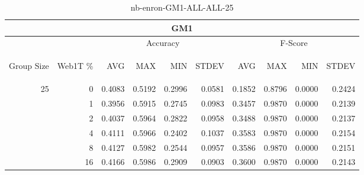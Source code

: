 \begin{center}
\begin{table}[htbp]
\begin{tabular}{ | r | r | r | r | r | r | r | r | r | r |}
\hline
\multicolumn{10}{|c|}{GM1}\\
\hline
 & & \multicolumn{4}{|c|}{Accuracy} & \multicolumn{4}{|c|}{F-Score}\\ \cline{3-10}
\begin{sideways}Group Size\end{sideways} & \begin{sideways}Web1T \%\end{sideways} & \begin{sideways}AVG\end{sideways} & \begin{sideways}MAX\end{sideways} & \begin{sideways}MIN\end{sideways} & \begin{sideways}STDEV\end{sideways} & \begin{sideways}AVG\end{sideways} & \begin{sideways}MAX\end{sideways} & \begin{sideways}MIN\end{sideways} & \begin{sideways}STDEV\end{sideways}\\
\hline
\multirow{6}{*}{25}
 & 0 & 0.4083 & 0.5192 & 0.2996 & 0.0581 & 0.1852 & 0.8796 & 0.0000 & 0.2424\\ \cline{2-10}
 & 1 & 0.3956 & 0.5915 & 0.2745 & 0.0983 & 0.3457 & 0.9870 & 0.0000 & 0.2139\\ \cline{2-10}
 & 2 & 0.4037 & 0.5964 & 0.2822 & 0.0958 & 0.3488 & 0.9870 & 0.0000 & 0.2137\\ \cline{2-10}
 & 4 & 0.4111 & 0.5966 & 0.2402 & 0.1037 & 0.3583 & 0.9870 & 0.0000 & 0.2154\\ \cline{2-10}
 & 8 & 0.4127 & 0.5982 & 0.2544 & 0.0957 & 0.3586 & 0.9870 & 0.0000 & 0.2151\\ \cline{2-10}
 & 16 & 0.4166 & 0.5986 & 0.2909 & 0.0903 & 0.3600 & 0.9870 & 0.0000 & 0.2143\\ \cline{2-10}
\hline
\end{tabular}
\caption{nb-enron-GM1-ALL-ALL-25}
\end{table}
\end{center}

